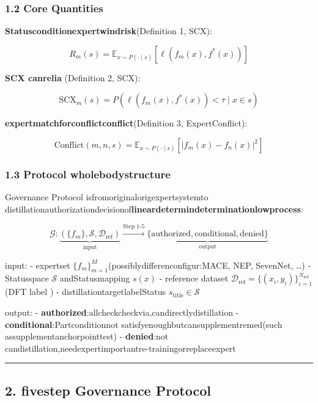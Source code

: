 \documentclass[
  12pt,
]{article}
\begin{document}
\subsubsection{1.2 Core Quantities}\label{ux6838ux5fc3ux91cf}

\textbf{Statusconditionexpertwindrisk}(Definition 1, SCX):

\[R_m(s) = \mathbb{E}_{x \sim P(\cdot \mid s)}[\ell(f_m(x), f^*(x))]\]

\textbf{SCX canrelia }(Definition 2, SCX):

\[\text{SCX}_m(s) = P(\ell(f_m(x), f^*(x)) < \tau \mid x \in s)\]

\textbf{expertmatchforconflictconflict}(Definition 3, ExpertConflict):

\[\text{Conflict}(m, n, s) = \mathbb{E}_{x \sim P(\cdot \mid s)}[|f_m(x) - f_n(x)|^2]\]

\subsubsection{1.3 Protocol
wholebodystructure}\label{protocol-ux6574ux4f53ux7ed3ux6784}

Governance Protocol
isfromoriginalorigexpertsystemto distillationauthorizationdecisionof\textbf{lineardetermindeterminationlowprocess}:

\[\mathcal{G}: \underbrace{(\{f_m\}, \mathcal{S}, \mathcal{D}_{\text{ref}})}_{\text{input}} \xrightarrow{\text{Step 1-5}} \underbrace{\{\text{authorized}, \text{conditional}, \text{denied}\}}_{\text{output}}\]

input: - expertset \(\{f_m\}_{m=1}^M\)(possiblydifferenconfigur:MACE, NEP, SevenNet,
\ldots) - Statusspace \(\mathcal{S}\) andStatusmapping \(s(x)\) - reference dataset
\(\mathcal{D}_{\text{ref}} = \{(x_i, y_i)\}_{i=1}^{N_{\text{ref}}}\)(DFT
label ) - distillationtargetlabelStatus \(s_{\text{title}} \in \mathcal{S}\)

output: - \textbf{authorized}:allcheckcheckvia,candirectlydistillation -
\textbf{conditional}:Partconditionnot satisfyenoughbutcansupplementremed(such assupplementanchorpointtest) -
\textbf{denied}:not candistillation,needexpertimportantre-trainingorreplaceexpert

\begin{center}\rule{0.5\linewidth}{0.5pt}\end{center}

\subsection{2. fivestep Governance
Protocol}\label{ux4e94ux6b65-governance-protocol}
\end{document}

